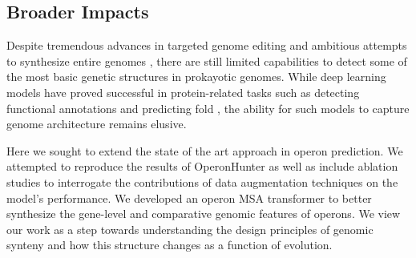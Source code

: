 \documentclass{article}
\begin{document}
\subsection{Broader Impacts}

Despite tremendous advances in targeted genome editing \cite{jinek_2012} and ambitious attempts to synthesize entire genomes \cite{richardson_2017}, there are still limited capabilities to detect some of the most basic genetic structures in prokayotic genomes. While deep learning models have proved successful in protein-related tasks such as detecting functional annotations \cite{bileschi_2022} and predicting fold \cite{jumper_2021}, the ability for such models to capture genome architecture remains elusive. 

Here we sought to extend the state of the art approach in operon prediction. We attempted to reproduce the results of OperonHunter as well as include ablation studies to interrogate the contributions of data augmentation techniques on the model's performance. We developed an operon MSA transformer to better synthesize the gene-level and comparative genomic features of operons. We view our work as a step towards understanding the design principles of genomic synteny and how this structure changes as a function of evolution.

\section*{} 
\small{

}


\end{document}
